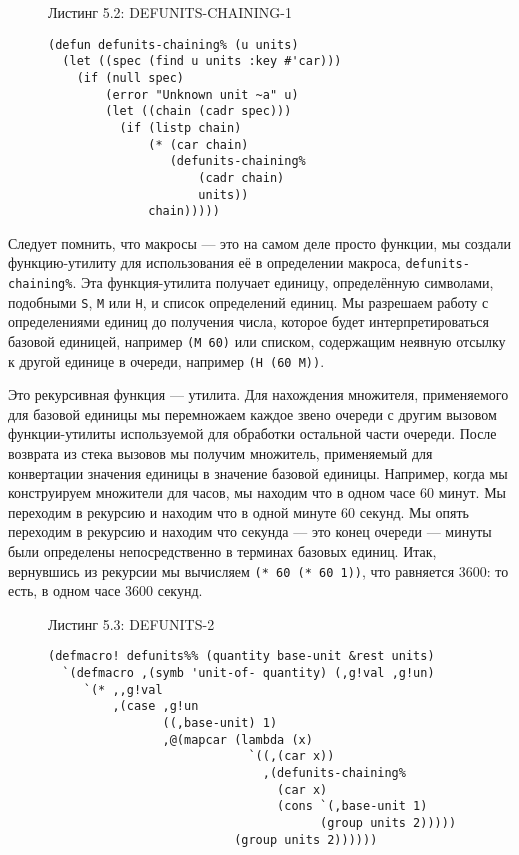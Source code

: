 \begin{figure}Листинг 5.2: DEFUNITS-CHAINING-1\label{listing_5.2}
\listbegin
\begin{verbatim}
(defun defunits-chaining% (u units)
  (let ((spec (find u units :key #'car)))
    (if (null spec)
        (error "Unknown unit ~a" u)
        (let ((chain (cadr spec)))
          (if (listp chain)
              (* (car chain)
                 (defunits-chaining%
                     (cadr chain)
                     units))
              chain)))))
\end{verbatim}
\listend
\end{figure}

Следует помнить, что макросы --- это на самом деле просто функции, мы создали функцию-утилиту для использования её в определении макроса, \verb"defunits-chaining%". Эта функция-утилита получает единицу, определённую символами, подобными \verb"S", \verb"M" или \verb"H", и список определений единиц. Мы разрешаем работу с определениями единиц до получения числа, которое будет интерпретироваться базовой единицей, например \verb"(M 60)" или списком, содержащим неявную отсылку к другой единице в очереди, например \verb"(H (60 M))".

Это рекурсивная функция --- утилита. Для нахождения множителя, применяемого для базовой единицы мы перемножаем каждое звено очереди с другим вызовом функции-утилиты используемой для обработки остальной части очереди. После возврата из стека вызовов мы получим множитель, применяемый для конвертации значения единицы в значение базовой единицы. Например, когда мы конструируем множители для часов, мы находим что в одном часе 60 минут. Мы переходим в рекурсию и находим что в одной минуте 60 секунд. Мы опять переходим в рекурсию и находим что секунда --- это конец очереди --- минуты были определены непосредственно в терминах базовых единиц. Итак, вернувшись из рекурсии мы вычисляем \verb"(* 60 (* 60 1))", что равняется 3600: то есть, в одном часе 3600 секунд.

\begin{figure}Листинг 5.3: DEFUNITS-2\label{listing_5.3}
\listbegin
\begin{verbatim}
(defmacro! defunits%% (quantity base-unit &rest units)
  `(defmacro ,(symb 'unit-of- quantity) (,g!val ,g!un)
     `(* ,,g!val
         ,(case ,g!un
                ((,base-unit) 1)
                ,@(mapcar (lambda (x)
                            `((,(car x))
                              ,(defunits-chaining%
                                (car x)
                                (cons `(,base-unit 1)
                                      (group units 2)))))
                          (group units 2))))))
\end{verbatim}
\listend
\end{figure}

